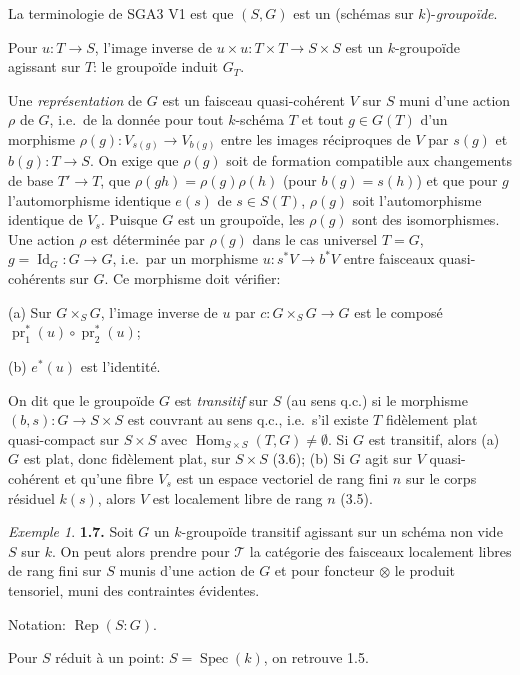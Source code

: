 \documentclass[12pt,a4paper]{article}
\theoremstyle{plain}
\theoremstyle{definition}
\theoremstyle{remark}
\newtheorem{example}[theorem]{Exemple}
\DeclareMathOperator{\Hom}{Hom}
\DeclareMathOperator{\Spec}{Spec}
\DeclareMathOperator{\Id}{Id}
\DeclareMathOperator{\pr}{pr}
\DeclareMathOperator{\Rep}{Rep}
\begin{document}
La terminologie de SGA3 V1 est que $(S,G)$ est un (schémas sur $k$)-\emph{groupoïde}.

Pour $u : T \to S$, l'image inverse de $u \times u : T \times T \to S \times S$ est un $k$-groupoïde agissant sur $T$: le groupoïde induit $G_T$.

Une \emph{représentation} de $G$ est un faisceau quasi-cohérent $V$ sur $S$ muni d'une action $\rho$ de $G$, i.e.~de la donnée pour tout $k$-schéma $T$ et tout $g \in G(T)$ d'un morphisme $\rho(g) : V_{s(g)} \to V_{b(g)}$ entre les images réciproques de $V$ par $s(g)$ et $b(g) : T \to S$. On exige que $\rho(g)$ soit de formation compatible aux changements de base $T' \to T$, que $\rho(gh) = \rho(g)\rho(h)$ (pour $b(g) = s(h)$) et que pour $g$ l'automorphisme identique $e(s)$ de $s \in S(T)$, $\rho(g)$ soit l'automorphisme identique de $V_s$. Puisque $G$ est un groupoïde, les $\rho(g)$ sont des isomorphismes. Une action $\rho$ est déterminée par $\rho(g)$ dans le cas universel $T = G$, $g = \Id_G : G \to G$, i.e.~par un morphisme $u : s^*V \to b^*V$ entre faisceaux quasi-cohérents sur $G$. Ce morphisme doit vérifier:

(a) Sur $G \times_S G$, l'image inverse de $u$ par $c : G \times_S G \to G$ est le composé $\pr_1^*(u) \circ \pr_2^*(u)$;

(b) $e^*(u)$ est l'identité.

On dit que le groupoïde $G$ est \emph{transitif} sur $S$ (au sens q.c.) si le morphisme $(b,s) : G \to S \times S$ est couvrant au sens q.c., i.e.~s'il existe $T$ fidèlement plat quasi-compact sur $S \times S$ avec $\Hom_{S \times S}(T,G) \neq \emptyset$. Si $G$ est transitif, alors (a) $G$ est plat, donc fidèlement plat, sur $S \times S$ (3.6); (b) Si $G$ agit sur $V$ quasi-cohérent et qu'une fibre $V_s$ est un espace vectoriel de rang fini $n$ sur le corps résiduel $k(s)$, alors $V$ est localement libre de rang $n$ (3.5).

\begin{example}
\textbf{1.7.} Soit $G$ un $k$-groupoïde transitif agissant sur un schéma non vide $S$ sur $k$. On peut alors prendre pour $\mathcal{T}$ la catégorie des faisceaux localement libres de rang fini sur $S$ munis d'une action de $G$ et pour foncteur $\otimes$ le produit tensoriel, muni des contraintes évidentes.

Notation: $\Rep(S:G)$.

Pour $S$ réduit à un point: $S = \Spec(k)$, on retrouve 1.5.
\end{example}
\end{document}
